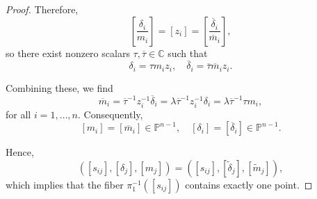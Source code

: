 \documentclass[10pt,a4paper]{amsart}
\begin{document}
\begin{proof}
Therefore,
\[
\left[ \frac{\delta_i}{m_i} \right] = [z_i] = \left[ \frac{\overline{\delta}_i}{\overline{m}_i} \right],
\]
so there exist nonzero scalars $\tau, \overline{\tau} \in \mathbb{C}$ such that
\[
\delta_i = \tau m_i z_i, \quad \overline{\delta}_i = \overline{\tau} \overline{m}_i z_i.
\]

Combining these, we find
\[
\overline{m}_i = \overline{\tau}^{-1} z_i^{-1} \overline{\delta}_i = \lambda \overline{\tau}^{-1} z_i^{-1} \delta_i = \lambda \overline{\tau}^{-1} \tau m_i,
\]
for all $i = 1, \dots, n$. Consequently,
\[
[m_i] = [\overline{m}_i] \in \mathbb{P}^{n-1}, \quad [\delta_i] = [\overline{\delta}_i] \in \mathbb{P}^{n-1}.
\]

Hence,
\[
([s_{ij}], [\delta_j], [m_j]) = ([s_{ij}], [\tilde{\delta}_j], [\tilde{m}_j]),
\]
which implies that the fiber $\pi_1^{-1}([s_{ij}])$ contains exactly one point.
\end{proof}
\end{document}
